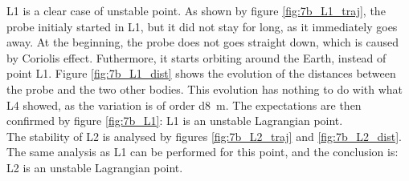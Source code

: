 \documentclass[a4paper,12pt,twoside]{article}
\begin{document}
L1 is a clear case of unstable point.
As shown by figure \ref{fig:7b_L1_traj}, the probe initialy started in L1, but it did not stay for long, as it immediately goes away.
At the beginning, the probe does not goes straight down, which is caused by Coriolis effect.
Futhermore, it starts orbiting around the Earth, instead of point L1.
Figure \ref{fig:7b_L1_dist} shows the evolution of the distances between the probe and the two other bodies.
This evolution has nothing to do with what L4 showed, as the variation is of order \SI{d8}{\m}.
The expectations are then confirmed by figure \ref{fig:7b_L1}: L1 is an unstable Lagrangian point.\\

The stability of L2 is analysed by figures \ref{fig:7b_L2_traj} and \ref{fig:7b_L2_dist}.
The same analysis as L1 can be performed for this point, and the conclusion is: L2 is an unstable Lagrangian point.\\
\end{document}

